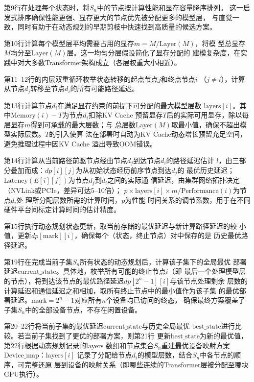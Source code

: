 第9行在处理每个状态时，将$S_n$中的节点按计算性能和显存容量降序排列。
这一启发式排序确保性能更强、显存更大的节点优先被分配更多的模型层，
与直觉一致，同时有助于在动态规划的早期剪枝中快速找到高质量的候选方案。

第10行计算每个模型层平均需要占用的显存$m = M / \text{Layer}(M)$，将模
型总显存$M$均分至$\text{Layer}(M)$层。这一均匀分层假设简化了显存分配的
建模复杂度，在实践中对大多数Transformer架构成立（各层权重大小相近）。

第11--12行的内层双重循环枚举状态转移的起点节点$j$和终点节点$i$
（$j \neq i$），计算从节点$d_j$转移至节点$d_i$的所有可能路径延迟。

第13行计算节点$d_i$在满足显存约束的前提下可分配的最大模型层数
$\text{layers}[i]$。其中$\text{Memory}(i) - T$为节点$d_i$扣除KV Cache
预留显存$T$后的实际可用显存，除以每层显存$m$得到可承载的最大层数；与
总层数$\text{Layer}(M)$取最小值，确保不超出模型实际层数。$T$的引入使算
法在部署时自动为KV Cache动态增长预留充足空间，避免推理过程中因KV Cache
溢出导致OOM错误。

第14行计算从当前路径前驱节点经由节点$d_j$到达节点$d_i$的路径延迟估计
$l$，由三部分叠加而成：$dp[i][j]$为从初始状态经历前序节点到达$d_j$的
最优历史延迟；$\text{Latency}(E[i][j])$为节点$d_j$到$d_i$之间的实际通
信延迟，由集群网络拓扑决定（NVLink或PCIe，差异可达5--10倍）；
$p \times \text{layers}[i] \times m / \text{Performance}(i)$为节点$d_i$处
理所分配层数所需的计算时间，$p$为性能-时间关系的调节系数，用于在不同
硬件平台间标定计算时间的估计精度。

第15行执行动态规划状态更新，取当前存储的最优延迟与新计算路径延迟的较
小值，更新$dp[\text{mark}][i]$，确保每个（状态，终止节点）对中保存的是
历史最优路径延迟。

第19行在完成当前子集$S_n$所有状态的动态规划后，计算该子集下的全局最优
部署延迟$\text{current\_state}$。具体地，枚举所有可能的终止节点$i$（即
最后一个处理模型层的节点），将到达该节点的最优路径延迟$dp[2^n-1][i]$与该节点处理剩余
层数的计算延迟和通信延迟之和相加，取所有终止节点中的最小值作为该子集
的最优部署延迟。$\text{mark}=2^n-1$对应所有$n$个设备均已访问的终态，
确保最终方案覆盖了子集$S_n$中的全部设备节点，不存在闲置设备。

第20--22行将当前子集的最优延迟$\text{current\_state}$与历史全局最优
$\text{best\_state}$进行比较。若当前子集找到了更优的部署方案，则第21行
更新$\text{best\_state}$为新的最优值，第22行根据动态规划记录的$\text{layers}$
数组和节点集合$S_n$重建最优设备映射方案$\text{Device\_map}$：$\text{layers}[i]$
记录了分配给节点$d_i$的模型层数，结合$S_n$中各节点的顺序，可完整还原
层到设备的映射关系（即哪些连续的Transformer层被分配至哪块GPU执行）。

